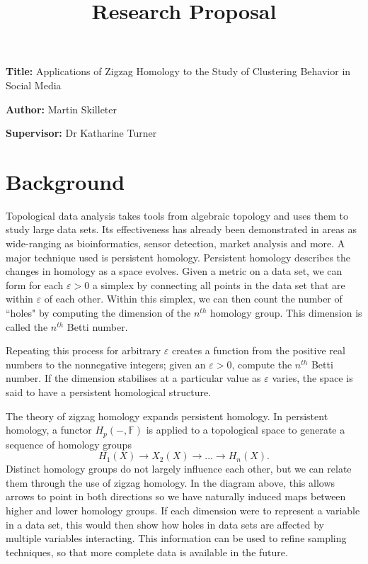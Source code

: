 \documentclass[12pt, a4paper]{article}
\title{Research Proposal}
\author{}
\date{}
\newcommand{\namelistlabel}[1]{\mbox{#1}\hfil}
\newcommand\e{\varepsilon}
\newenvironment{namelist}[1]{%
\begin{list}{}
    {
        \let\makelabel\namelistlabel
        \settowidth{\labelwidth}{#1}
        \setlength{\leftmargin}{1.1\labelwidth}
    }
  }{%
\end{list}}
\begin{document}
\maketitle

\begin{namelist}{xxxxxxxxxxxx}
\item[{\bf Title:}]
	Applications of Zigzag Homology to the Study of Clustering Behavior in Social Media
\item[{\bf Author:}]
	Martin Skilleter
\item[{\bf Supervisor:}]
	Dr Katharine Turner
\end{namelist}

\section*{Background} 

Topological data analysis takes tools from algebraic topology and uses them to study large data sets. Its effectiveness has already been demonstrated in areas as wide-ranging as bioinformatics, sensor detection, market analysis and more. A major technique used is persistent homology. Persistent homology describes the changes in homology as a space evolves. Given a metric on a data set, we can form for each $\e > 0$ a simplex by connecting all points in the data set that are within $\e$ of each other. Within this simplex, we can then count the number of ``holes" by computing the dimension of the $n^{th}$ homology group. This dimension is called the $n^{th}$ Betti number. 

Repeating this process for arbitrary $\e$ creates a function from the positive real numbers to the nonnegative integers; given an $\e > 0$, compute the $n^{th}$ Betti number. If the dimension stabilises at a particular value as $\e$ varies, the space is said to have a persistent homological structure.

The theory of zigzag homology expands persistent homology. In persistent homology, a functor $H_p(-, \mathbb{F})$ is applied to a topological space to generate a sequence of homology groups
\[ H_1(X) \to X_2(X) \to ... \to H_n(X). \]
Distinct homology groups do not largely influence each other, but we can relate them through the use of zigzag homology. In the diagram above, this allows arrows to point in both directions so we have naturally induced maps between higher and lower homology groups. If each dimension were to represent a variable in a data set, this would then show how holes in data sets are affected by multiple variables interacting. This information can be used to refine sampling techniques, so that more complete data is available in the future.
\end{document}
